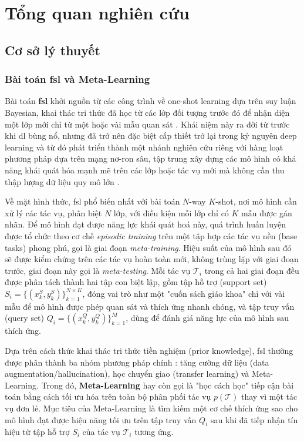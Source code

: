 \chapter{Tổng quan nghiên cứu}
\label{Chapter2}

\section{Cơ sở lý thuyết}
\label{sec:background}
\subsection{Bài toán \acrfull{fsl} và Meta-Learning}

Bài toán \textbf{\acrfull{fsl}} khởi nguồn từ các công trình về one-shot learning dựa trên suy luận Bayesian, khai thác tri thức đã học từ các lớp đối tượng trước đó để nhận diện một lớp mới chỉ từ một hoặc vài mẫu quan sát \cite{fei2006one}. Khái niệm này ra đời từ trước khi \acrlong{dl} bùng nổ, nhưng đã trở nên đặc biệt cấp thiết trở lại trong kỷ nguyên deep learning và từ đó phát triển thành một nhánh nghiên cứu riêng với hàng loạt phương pháp dựa trên mạng nơ-ron sâu, tập trung xây dựng các mô hình có khả năng khái quát hóa mạnh mẽ trên các lớp hoặc tác vụ mới mà không cần thu thập lượng dữ liệu quy mô lớn \cite{wang2020generalizing}.

Về mặt hình thức, \acrshort{fsl} phổ biến nhất với bài toán $N$-way $K$-shot, nơi mô hình cần xử lý các tác vụ, phân biệt $N$ lớp, với điều kiện mỗi lớp chỉ có $K$ mẫu được gán nhãn. Để mô hình đạt được năng lực khái quát hoá này, quá trình huấn luyện được tổ chức theo cơ chế \emph{episodic training} trên một tập hợp các tác vụ nền (base tasks) phong phú, gọi là giai đoạn \emph{meta-training}. Hiệu suất của mô hình sau đó sẽ được kiểm chứng trên các tác vụ hoàn toàn mới, không trùng lặp với giai đoạn trước, giai đoạn này gọi là \emph{meta-testing}. Mỗi tác vụ $\mathcal{T}_i$ trong cả hai giai đoạn đều được phân tách thành hai tập con biệt lập, gồm tập hỗ trợ (support set) $S_i = \{(x_k^S, y_k^S)\}_{k=1}^{N\times K}$, đóng vai trò như một "cuốn sách giáo khoa" chỉ với vài mẫu để mô hình được phép quan sát và thích ứng nhanh chóng, và tập truy vấn (query set) $Q_i = \{(x_k^Q, y_k^Q)\}_{k=1}^{M}$, dùng để đánh giá năng lực của mô hình sau thích ứng.

Dựa trên cách thức khai thác tri thức tiền nghiệm (prior knowledge), \acrshort{fsl} thường được phân thành ba nhóm phương pháp chính \cite{wang2020generalizing, song2023comprehensive}: tăng cường dữ liệu (data augmentation/hallucination), học chuyển giao (transfer learning) và Meta-Learning. Trong đó, \textbf{Meta-Learning} hay còn gọi là "học cách học" tiếp cận bài toán bằng cách tối ưu hóa trên toàn bộ phân phối tác vụ $p(\mathcal{T})$ thay vì một tác vụ đơn lẻ. Mục tiêu của Meta-Learning là tìm kiếm một cơ chế thích ứng sao cho mô hình đạt được hiệu năng tối ưu trên tập truy vấn $Q_i$  sau khi đã tiếp nhận tín hiệu từ tập hỗ trợ $S_i$ của tác vụ $\mathcal{T}_i$ tương ứng.

